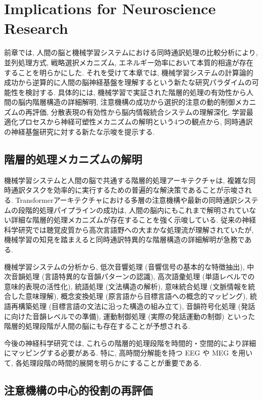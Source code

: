 \section{Implications for Neuroscience Research}

前章では, 人間の脳と機械学習システムにおける同時通訳処理の比較分析により, 並列処理方式, 戦略選択メカニズム, エネルギー効率において本質的相違が存在することを明らかにした.
それを受けて本章では, 機械学習システムの計算論的成功から逆算的に人間の脳神経基盤を理解するという新たな研究パラダイムの可能性を検討する.
具体的には, 機械学習で実証された階層的処理の有効性から人間の脳内階層構造の詳細解明, 注意機構の成功から選択的注意の動的制御メカニズムの再評価, 分散表現の有効性から脳内情報統合システムの理解深化, 学習最適化プロセスから神経可塑性メカニズムの解明という4つの観点から, 同時通訳の神経基盤研究に対する新たな示唆を提示する.

\subsection{階層的処理メカニズムの解明}

機械学習システムと人間の脳で共通する階層的処理アーキテクチャは, 複雑な同時通訳タスクを効率的に実行するための普遍的な解決策であることが示唆される.
Transformerアーキテクチャにおける多層の注意機構や最新の同時通訳システムの段階的処理パイプラインの成功は, 人間の脳内にもこれまで解明されていない詳細な階層的処理メカニズムが存在することを強く示唆している.
従来の神経科学研究では聴覚皮質から高次言語野への大まかな処理流が理解されていたが, 機械学習の知見を踏まえると同時通訳特異的な階層構造の詳細解明が急務である.

機械学習システムの分析から, 低次音響処理 (音響信号の基本的な特徴抽出), 中次音韻処理 (言語特異的な音韻パターンの認識), 高次語彙処理 (単語レベルでの意味的表現の活性化), 統語処理 (文法構造の解析), 意味統合処理 (文脈情報を統合した意味理解), 概念変換処理 (原言語から目標言語への概念的マッピング), 統語再構築処理 (目標言語の文法に沿った構造の組み立て), 音韻符号化処理 (発話に向けた音韻レベルでの準備), 運動制御処理 (実際の発話運動の制御) といった階層的処理段階が人間の脳にも存在することが予想される.

今後の神経科学研究では, これらの階層的処理段階を時間的・空間的により詳細にマッピングする必要がある.
特に, 高時間分解能を持つ EEG や MEG を用いて, 各処理段階の時間的展開を明らかにすることが重要である.

\subsection{注意機構の中心的役割の再評価}

